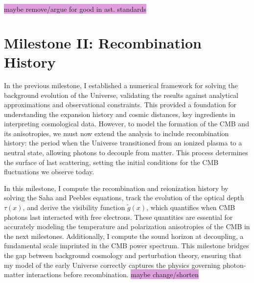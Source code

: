 \documentclass{aa}
\begin{document}
\colorbox{Plum}{maybe remove/argue for good in ast. standards}




\section{Milestone II: Recombination History}\label{sec: milestone II}
In the previous milestone, I established a numerical framework for solving the background evolution of the Universe, validating the results against analytical approximations and observational constraints. This provided a foundation for understanding the expansion history and cosmic distances, key ingredients in interpreting cosmological data. However, to model the formation of the CMB and its anisotropies, we must now extend the analysis to include recombination history: the period when the Universe transitioned from an ionized plasma to a neutral state, allowing photons to decouple from matter. This process determines the surface of last scattering, setting the initial conditions for the CMB fluctuations we observe today.  

In this milestone, I compute the recombination and reionization history by solving the Saha and Peebles equations, track the evolution of the optical depth $\tau(x)$, and derive the visibility function $\tilde{g}(x)$, which quantifies when CMB photons last interacted with free electrons. These quantities are essential for accurately modeling the temperature and polarization anisotropies of the CMB in the next milestones. Additionally, I compute the sound horizon at decoupling, a fundamental scale imprinted in the CMB power spectrum. This milestone bridges the gap between background cosmology and perturbation theory, ensuring that my model of the early Universe correctly captures the physics governing photon-matter interactions before recombination. \colorbox{Plum}{maybe change/shorten}
\end{document}
